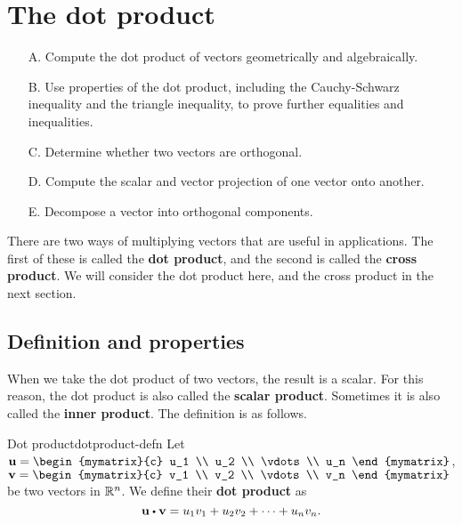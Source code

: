 \section{The dot product}

\begin{outcome}

\begin{enumerate}
\item[A.] Compute the dot product of vectors geometrically and
  algebraically.
\item[B.] Use properties of the dot product, including the
  Cauchy-Schwarz inequality and the triangle inequality, to prove
  further equalities and inequalities.
\item[C.] Determine whether two vectors are orthogonal.
\item[D.] Compute the scalar and vector projection of one vector onto
  another.
\item[E.] Decompose a vector into orthogonal components.
\end{enumerate}
\end{outcome}

There are two ways of multiplying vectors that are useful in
applications. The first of these is called the \textbf{dot product},
and the second is called the \textbf{cross product}. We will consider
the dot product here, and the cross product in the next section.

\subsection{Definition and properties}

When we take the dot product of two vectors, the result is a
scalar. For this reason, the dot product is also called the
\textbf{scalar product}. Sometimes it is also called the \textbf{inner
  product}. The definition is as follows.  
  

\begin{definition}{Dot product}{dotproduct-defn}
  Let $\vect{u}=\begin{mymatrix}{c}
    u_1 \\
    u_2 \\
    \vdots \\
    u_n 
  \end{mymatrix}$, $\vect{v}= \begin{mymatrix}{c}
    v_1 \\
    v_2 \\
    \vdots \\
    v_n 
  \end{mymatrix}$ be two vectors in $\mathbb{R}^{n}$. We
  define their \textbf{dot product} as
  \begin{equation*}
    \vect{u}\dotprod \vect{v} = u_1v_1+u_2v_2+\cdots+u_nv_n.
  \end{equation*}
\end{definition}

